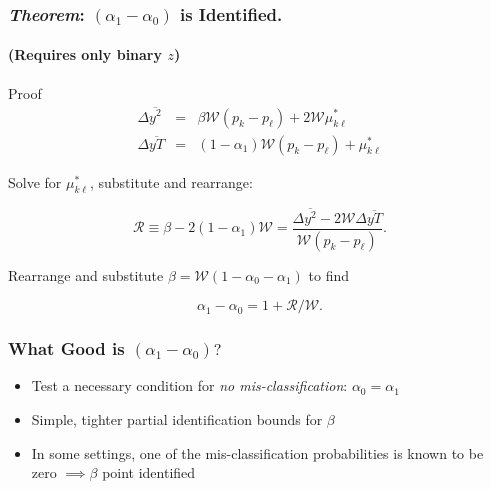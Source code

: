 \documentclass{beamer}
\begin{document}
\begin{frame}
  \frametitle{\emph{Theorem}: $(\alpha_1 - \alpha_0)$ is Identified.}
  \framesubtitle{(Requires only binary $z$)}
  \begin{block}{Proof}
  \vspace{-1.5em}
  \begin{eqnarray*}
    \Delta\overline{y^2} &=& \beta \mathcal{W} (p_k - p_\ell)  + 2 \mathcal{W} \mu_{k\ell}^* \\
    \Delta\overline{yT} &=& (1-\alpha_1)\mathcal{W}(p_k - p_\ell) + \mu_{k\ell}^* 
  \end{eqnarray*}

  Solve for $\mu_{k\ell}^*$, substitute and rearrange:

  \begin{equation*}
    \mathcal{R} \equiv \beta - 2(1-\alpha_1)\mathcal{W} = \frac{\Delta\overline{y^2} - 2 \mathcal{W}\Delta\overline{yT}}{\mathcal{W}(p_k - p_\ell)}.
  \end{equation*}

  \vspace{0.4em}
  Rearrange and substitute $\beta=\mathcal{W}(1-\alpha_0 -\alpha_1)$ to find 

  \begin{equation*}
    \alpha_1 - \alpha_0 = 1 + \mathcal{R}/\mathcal{W}.
  \end{equation*}
\end{block}

\end{frame}
\begin{frame}
  \frametitle{What Good is $(\alpha_1 - \alpha_0)?$}
    \begin{itemize}
      \item Test a necessary condition for \emph{no mis-classification}: $\alpha_0 = \alpha_1$ 
      \item Simple, tighter partial identification bounds for $\beta$
      \item In some settings, one of the mis-classification probabilities is known to be zero $\implies \beta$ point identified 
    \end{itemize}
\end{frame}
\end{document}

